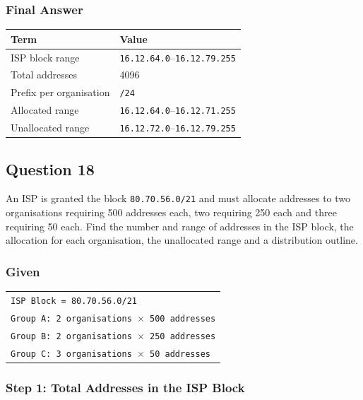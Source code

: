 \documentclass[11pt,a4paper]{article}
\begin{document}
\subsubsection*{Final Answer}

\begin{tabularx}{\textwidth}{@{}lX@{}}
\toprule
\rowcolor{tablehead}\textbf{Term} & \textbf{Value} \\
\midrule
ISP block range & \texttt{16.12.64.0}--\texttt{16.12.79.255} \\
Total addresses & 4096 \\
Prefix per organisation & \texttt{/24} \\
Allocated range & \texttt{16.12.64.0}--\texttt{16.12.71.255} \\
Unallocated range & \texttt{16.12.72.0}--\texttt{16.12.79.255} \\
\bottomrule
\end{tabularx}

\subsection*{Question 18}

An ISP is granted the block \texttt{80.70.56.0/21} and must allocate addresses to two
organisations requiring 500 addresses each, two requiring 250 each and three requiring 50
each. Find the number and range of addresses in the ISP block, the allocation for each
organisation, the unallocated range and a distribution outline.

\subsubsection*{Given}

\begin{tabularx}{\textwidth}{@{}X@{}}
\texttt{ISP Block = 80.70.56.0/21} \\
\texttt{Group A: 2 organisations $\times$ 500 addresses} \\
\texttt{Group B: 2 organisations $\times$ 250 addresses} \\
\texttt{Group C: 3 organisations $\times$ 50 addresses} \\
\end{tabularx}

\subsubsection*{Step 1: Total Addresses in the ISP Block}
\end{document}
